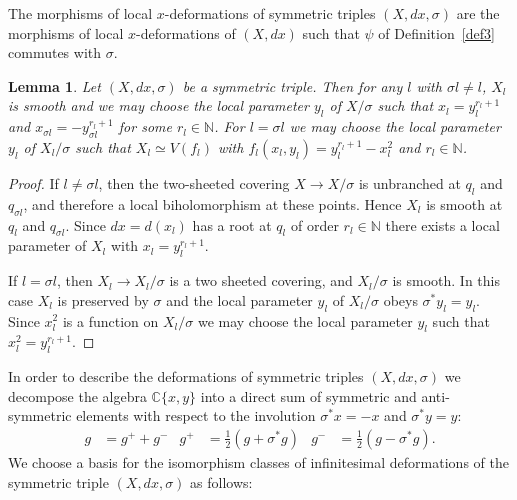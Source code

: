 \documentclass[11pt,twoside]{amsart}
\theoremstyle{plain}
\newtheorem{lemma}[theorem]{Lemma}
\newcommand{\Sm}{\mathcal{S}}
\newcommand{\dfx}{dx}
\begin{document}
The morphisms of local $x$-deformations of symmetric triples $(X,dx,\sigma)$ are the morphisms of local $x$-deformations of $(X,\dfx)$ %
such that $\psi$ of Definition~\ref{def3} commutes with $\sigma$.
\begin{lemma}
Let $(X,\dfx,\sigma)$ be a symmetric triple. Then for any $l$ with $\sigma l\ne l$, $X_l$ is smooth and we may choose the local parameter $y_l$ of $X/\sigma$ such that $x_l=y_l^{r_l+1}$ and $x_{\sigma l}=-y_{\sigma l}^{r_l+1}$ for some $r_l\in\mathbb{N}$. For $l=\sigma l$ we may choose the local parameter $y_l$ of $X_l/\sigma$ such that $X_l\simeq V(f_l)$ with $f_l(x_l,y_l)=y_l^{r_l+1}-x_l^2$ and $r_l\in\mathbb{N}$.
\end{lemma}
\begin{proof}
If $l\ne\sigma l$, then the two-sheeted covering $X \to  X/\sigma$ is unbranched at $q_l$ and $q_{\sigma l}$, and therefore a local biholomorphism at these points. Hence $X_l$ is smooth at $q_l$ and $q_{\sigma l}$. Since $\dfx=d(x_l)$ has a root at $q_l$ of order $r_l\in\mathbb{N}$ there exists a local parameter of $X_l$ with $x_l=y_l^{r_l+1}$.

If $l=\sigma l$, then $X_l\to X_l/\sigma$ is a two sheeted covering, and $X_l/\sigma$ is smooth. In this case $X_l$ is preserved by $\sigma$ and the local parameter $y_l$ of $X_l/\sigma$ obeys $\sigma^\ast y_l=y_l$. Since $x_l^2$ is a function on $X_l/\sigma$ we may choose the local parameter $y_l$ such that $x_l^2=y_l^{r_l+1}$.
\end{proof}
In order to describe the deformations of symmetric triples $(X,\dfx,\sigma)$ we decompose the algebra $\mathbb{C}\{x,y\}$ into a direct sum of symmetric and anti-symmetric elements with respect to the involution $\sigma^\ast x=-x$ and $\sigma^\ast y=y$:
\begin{align*}
g&=g^++g^-&g^+&=\tfrac{1}{2}(g+\sigma^\ast g)&g^-&=\tfrac{1}{2}(g-\sigma^\ast g).
\end{align*}
We choose a basis for the isomorphism classes of infinitesimal deformations of the symmetric triple $(X,dx,\sigma)$ as follows: 
\end{document}
